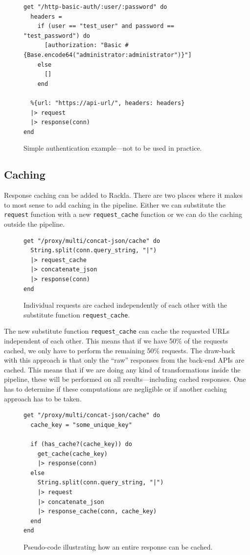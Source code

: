\documentclass{cslthse-msc}
\begin{document}
\begin{figure}[H]
  \centering
\begin{lstlisting}[breaklines=true,frame=single]
get "/http-basic-auth/:user/:password" do
  headers =
    if (user == "test_user" and password == "test_password") do
      [authorization: "Basic #{Base.encode64("administrator:administrator")}"]
    else
      []
    end
  
  %{url: "https://api-url/", headers: headers}
  |> request
  |> response(conn)
end
\end{lstlisting}
  \caption{Simple authentication example---not to be used in practice.}
\end{figure}

\subsection{Caching}
Response caching can be added to Rackla. There are two places where it makes to most sense to add caching in the pipeline. Either we can substitute the \lstinline{request} function with a new \lstinline{request_cache} function or we can do the caching outside the pipeline. 

\begin{figure}[H]
  \centering
\begin{lstlisting}[breaklines=true,frame=single]
get "/proxy/multi/concat-json/cache" do
  String.split(conn.query_string, "|")
  |> request_cache
  |> concatenate_json
  |> response(conn)
end
\end{lstlisting}
  \caption{Individual requests are cached independently of each other with the substitute function \lstinline{request_cache}.}
\end{figure}

The new substitute function \lstinline{request_cache} can cache the requested URLs independent of each other. This means that if we have 50\% of the requests cached, we only have to perform the remaining 50\% requests. The draw-back with this approach is that only the \enquote{raw} responses from the back-end APIs are cached. This means that if we are doing any kind of transformations inside the pipeline, these will be performed on all results---including cached responses. One has to determine if these computations are negligible or if another caching approach has to be taken.

\begin{figure}[H]
  \centering
\begin{lstlisting}[breaklines=true,frame=single]
get "/proxy/multi/concat-json/cache" do
  cache_key = "some_unique_key"
  
  if (has_cache?(cache_key)) do
    get_cache(cache_key)
    |> response(conn)
  else
    String.split(conn.query_string, "|")
    |> request
    |> concatenate_json
    |> response_cache(conn, cache_key)
  end
end
\end{lstlisting}
  \caption{Pseudo-code illustrating how an entire response can be cached.}
\end{figure}
\end{document}
